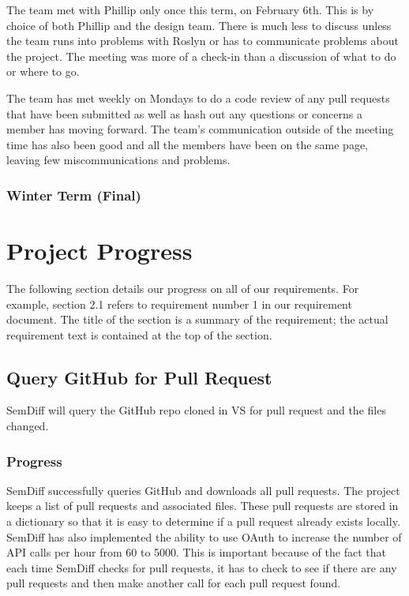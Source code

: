 \documentclass[10pt,draftclsnofoot,onecolumn]{IEEEtran}
\begin{document}
The team met with Phillip only once this term, on February 6th. This is by choice of both Phillip and the design team. There is much less to discuss unless the team runs into problems with Roslyn or has to communicate problems about the project. The meeting was more of a check-in than a discussion of what to do or where to go. 

The team has met weekly on Mondays to do a code review of any pull requests that have been submitted as well as hash out any questions or concerns a member has moving forward. The team’s communication outside of the meeting time has also been good and all the members have been on the same page, leaving few miscommunications and problems.

\subsubsection{Winter Term (Final)}

\section{Project Progress}
The following section details our progress on all of our requirements. For example, section 2.1 refers to requirement number 1 in our requirement document. The title of the section is a summary of the requirement; the actual requirement text is contained at the top of the section.

\subsection{Query GitHub for Pull Request}
SemDiff will query the GitHub repo cloned in VS for pull request and the files changed.

\subsubsection{Progress}
SemDiff successfully queries GitHub and downloads all pull requests. The project keeps a list of pull requests and associated files. These pull requests are stored in a dictionary so that it is easy to determine if a pull request already exists locally. SemDiff has also implemented the ability to use OAuth to increase the number of API calls per hour from 60 to 5000. This is important because of the fact that each time SemDiff checks for pull requests, it has to check to see if there are any pull requests and then make another call for each pull request found.
\end{document}
